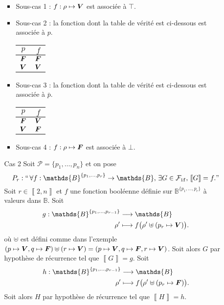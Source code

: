 \begin{enumerate}
\begin{itemize}
\begin{itemize}
					\item Sous-cas 1 : $f: \rho \mapsto {\bm{V}}$\/ est associée à $\top$.
					\item Sous-cas 2 :  la fonction dont la table de vérité est ci-dessous est associée à $p$.
						\begin{center}
							\begin{tabular}{c|c}
								$p$&$f$\\ \hline
								${\bm{F}}$ & ${\bm{F}}$\/ \\
								${\bm{V}}$ & ${\bm{V}}$\/ \\
							\end{tabular}
						\end{center}
					\item Sous-cas 3 :  la fonction dont la table de vérité est ci-dessous est associée à $\bar{p}$.
						\begin{center}
							\begin{tabular}{c|c}
								$p$&$f$\\ \hline
								${\bm{F}}$ & ${\bm{V}}$\/ \\
								${\bm{V}}$ & ${\bm{F}}$\/ \\
							\end{tabular}
						\end{center}
					\item Sous-cas 4 : $f: \rho \mapsto {\bm{F}}$\/ est associée à $\bot$.
				\end{itemize}
			\item[Cas 2] Soit $\mathcal{P} = \{p_1, \ldots,p_n\}$\/ et on pose \[
					P_r : ``\,\forall f : \mathds{B}^{\{p_1, \ldots, p_r\}}\to \mathds{B},\,\exists G \in \mathcal{F}_{{\tt if}},\,\left\llbracket G \right\rrbracket = f."
				\]
				Soit $r \in  \left\llbracket 2,n \right\rrbracket$\/ et $f$\/ une fonction booléenne définie sur $\mathds{B}^{\{p_1, \ldots, p_r\}}$\/ à valeurs dans $\mathds{B}$. Soit \begin{align*}
					g: \mathds{B}^{\{p_1,\ldots,p_{r-1}\}} &\longrightarrow \mathds{B} \\
					\rho' &\longmapsto f\big(\rho' \uplus (p_r \mapsto {\bfm V}\/)\big).
				\end{align*}
				où $\uplus$\/ est défini comme dans l'exemple $(p\mapsto {\bm{V}}, q\mapsto {\bm{F}}) \uplus (r \mapsto {\bm{V}}) = (p\mapsto {\bm{V}}, q\mapsto {\bm{F}}, r \mapsto {\bm{V}})$.
				Soit alors $G$\/ par hypothèse de récurrence tel que $\left\llbracket G \right\rrbracket = g$.
				Soit \begin{align*}
					h: \mathds{B}^{\{p_1, \ldots,p_{r-1}\}} &\longrightarrow \mathds{B} \\
					\rho' &\longmapsto f\big(\rho'\uplus (p_r \mapsto {\bfm F})\big).
				\end{align*}
				Soit alors $H$\/ par hypothèse de récurrence tel que $\left\llbracket H \right\rrbracket = h$.


\end{itemize}
\end{enumerate}
